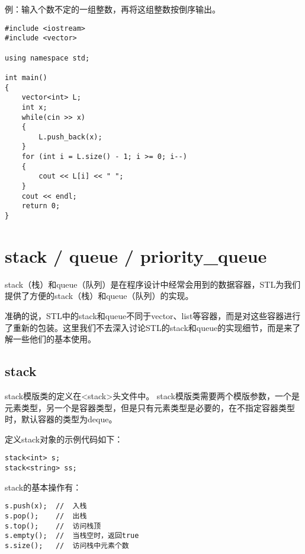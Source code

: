 例：输入个数不定的一组整数，再将这组整数按倒序输出。
\begin{lstlisting}
#include <iostream>
#include <vector>

using namespace std;

int main()
{
    vector<int> L;
    int x;
    while(cin >> x)
    {
        L.push_back(x);
    }
    for (int i = L.size() - 1; i >= 0; i--)
    {
        cout << L[i] << " ";
    }
    cout << endl;
    return 0;
}
\end{lstlisting}



\section{stack / queue / priority\_queue}
stack（栈）和queue（队列）是在程序设计中经常会用到的数据容器，STL为我们提供了方便的stack（栈）和queue（队列）的实现。

准确的说，STL中的stack和queue不同于vector、list等容器，而是对这些容器进行了重新的包装。这里我们不去深入讨论STL的stack和queue的实现细节，而是来了解一些他们的基本使用。

\subsection{stack}

stack模版类的定义在<stack>头文件中。 
stack模版类需要两个模版参数，一个是元素类型，另一个是容器类型，但是只有元素类型是必要的，在不指定容器类型时，默认容器的类型为deque。

定义stack对象的示例代码如下：
\begin{lstlisting}
stack<int> s;
stack<string> ss;
\end{lstlisting}

stack的基本操作有：
\begin{lstlisting}
s.push(x);  //  入栈
s.pop();    //  出栈
s.top();    //  访问栈顶
s.empty();  //  当栈空时，返回true
s.size();   //  访问栈中元素个数
\end{lstlisting}

